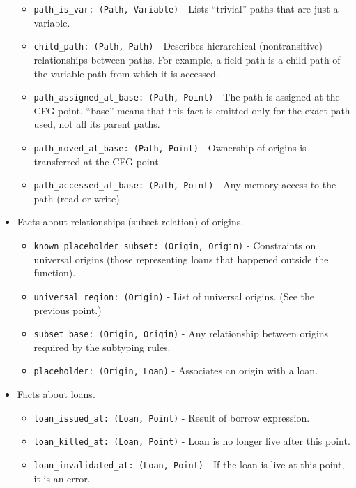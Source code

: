 \documentclass[
  11pt,
  twoside,symmetric]{report}
\providecommand{\tightlist}{%
  \setlength{\itemsep}{0pt}\setlength{\parskip}{0pt}}
\begin{document}
\begin{itemize}
  \begin{itemize}
  \tightlist
  \item
    \texttt{path\_is\_var:\ (Path,\ Variable)} - Lists ``trivial'' paths
    that are just a variable.
  \item
    \texttt{child\_path:\ (Path,\ Path)} - Describes hierarchical
    (nontransitive) relationships between paths. For example, a field
    path is a child path of the variable path from which it is accessed.
  \item
    \texttt{path\_assigned\_at\_base:\ (Path,\ Point)} - The path is
    assigned at the CFG point. ``base'' means that this fact is emitted
    only for the exact path used, not all its parent paths.
  \item
    \texttt{path\_moved\_at\_base:\ (Path,\ Point)} - Ownership of
    origins is transferred at the CFG point.
  \item
    \texttt{path\_accessed\_at\_base:\ (Path,\ Point)} - Any memory
    access to the path (read or write).
  \end{itemize}
\item
  Facts about relationships (subset relation) of origins.

  \begin{itemize}
  \tightlist
  \item
    \texttt{known\_placeholder\_subset:\ (Origin,\ Origin)} -
    Constraints on universal origins (those representing loans that
    happened outside the function).
  \item
    \texttt{universal\_region:\ (Origin)} - List of universal origins.
    (See the previous point.)
  \item
    \texttt{subset\_base:\ (Origin,\ Origin)} - Any relationship between
    origins required by the subtyping rules.
  \item
    \texttt{placeholder:\ (Origin,\ Loan)} - Associates an origin with a
    loan.
  \end{itemize}
\item
  Facts about loans.

  \begin{itemize}
  \tightlist
  \item
    \texttt{loan\_issued\_at:\ (Loan,\ Point)} - Result of borrow
    expression.
  \item
    \texttt{loan\_killed\_at:\ (Loan,\ Point)} - Loan is no longer live
    after this point.
  \item
    \texttt{loan\_invalidated\_at:\ (Loan,\ Point)} - If the loan is
    live at this point, it is an error.
  \end{itemize}
\end{itemize}
\end{document}
